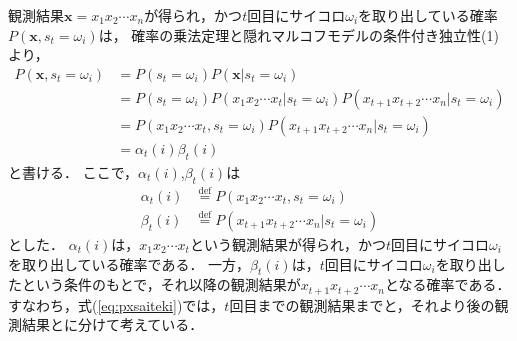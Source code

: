 \documentclass[a4j]{jarticle}
\begin{document}
観測結果$\mathbf{x} = x_{1}x_{2} \cdots x_{n}$が得られ，かつ$t$回目にサイコロ$\omega_{i}$を取り出している確率$P(\mathbf{x}, s_{t}=\omega_{i})$は，
確率の乗法定理と隠れマルコフモデルの条件付き独立性(1)より，
\begin{align}
P(\mathbf{x}, s_{t} = \omega_{i}) &= P(s_{t} = \omega_{i}) P(\mathbf{x} | s_{t} = \omega_{i}) \nonumber \\
& =  P(s_{t} = \omega_{i}) P(x_{1}x_{2} \cdots x_{t} | s_{t}=\omega_{i}) P(x_{t+1}x_{t+2} \cdots x_{n}|s_{t}=\omega_{i}) \nonumber \\
& =  P(x_{1}x_{2} \cdots x_{t}, s_{t}=\omega_{i}) P(x_{t+1}x_{t+2} \cdots x_{n}|s_{t}=\omega_{i}) \nonumber \\
& = \alpha_{t}(i) \beta_{t}(i) \label{eq:pxsaiteki}
\end{align}
と書ける．
ここで，$\alpha_{t}(i)$,$\beta_{t}(i)$は
\begin{align}
\alpha_{t}(i) & \overset{\mathrm{def}}{=}  P(x_{1}x_{2} \cdots x_{t}, s_{t}=\omega_{i}) \label{eq:alpha}\\
\beta_{t}(i)  & \overset{\mathrm{def}}{=}  P(x_{t+1}x_{t+2} \cdots x_{n}|s_{t}=\omega_{i})  \label{eq:beta}
\end{align}
とした．
$\alpha_{t}(i)$は，$x_{1}x_{2}\cdots x_{t}$という観測結果が得られ，かつ$t$回目にサイコロ$\omega_{i}$を取り出している確率である．
一方，$\beta_{t}(i)$は，$t$回目にサイコロ$\omega_{i}$を取り出したという条件のもとで，それ以降の観測結果が$x_{t+1}x_{t+2} \cdots x_{n}$となる確率である．
すなわち，式(\ref{eq:pxsaiteki})では，$t$回目までの観測結果までと，それより後の観測結果とに分けて考えている．
\end{document}
